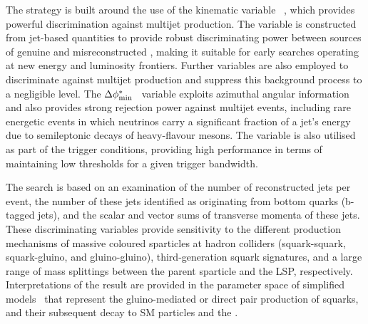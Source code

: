 The strategy is built around the use of the kinematic variable
\alphat~\cite{Randall:2008rw, RA1Paper}, which provides powerful
discrimination against multijet production. The \alphat variable is
constructed from jet-based quantities to provide robust discriminating
power between sources of genuine and misreconstructed \ptvecmiss,
making it suitable for early searches operating at new energy and
luminosity frontiers. Further variables are also employed to
discriminate against multijet production and suppress this background
process to a negligible level. The $\Delta\phi^{*}_{\rm
  min}$~\cite{RA1Paper} variable exploits azimuthal angular
information and also provides strong rejection power against multijet
events, including rare energetic events in which neutrinos carry a
significant fraction of a jet's energy due to semileptonic decays of
heavy-flavour mesons. The \alphat variable is also utilised as part of
the trigger conditions, providing high performance in terms of
maintaining low thresholds for a given trigger bandwidth.


The search is based on an examination of the number of reconstructed
jets per event, the number of these jets identified as originating
from bottom quarks (b-tagged jets), and the scalar and vector sums of
transverse momenta of these jets.  These discriminating variables
provide sensitivity to the different production mechanisms of massive
coloured sparticles at hadron colliders (\ie squark-squark,
squark-gluino, and gluino-gluino), third-generation squark signatures,
and a large range of mass splittings between the parent sparticle and
the LSP, respectively. Interpretations of the result are provided in
the parameter space of simplified models~\cite{Alwall:2008ag,
  Alwall:2008va, sms} that represent the gluino-mediated or direct
pair production of squarks, and their subsequent decay to SM particles
and the \chiz.

